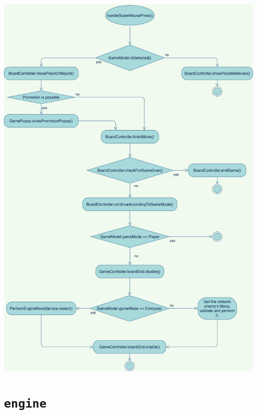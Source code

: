 \documentclass{scrreprt}
\newcommand{\lstinlinejava}[1]{\lstinline[language=java]{#1}}
\newcommand{\lstj}[1]{\lstinlinejava{#1}}
\begin{document}
\includegraphics{ActivityDiagramMove}


\chapter{\lstj{engine}}
\end{document}
